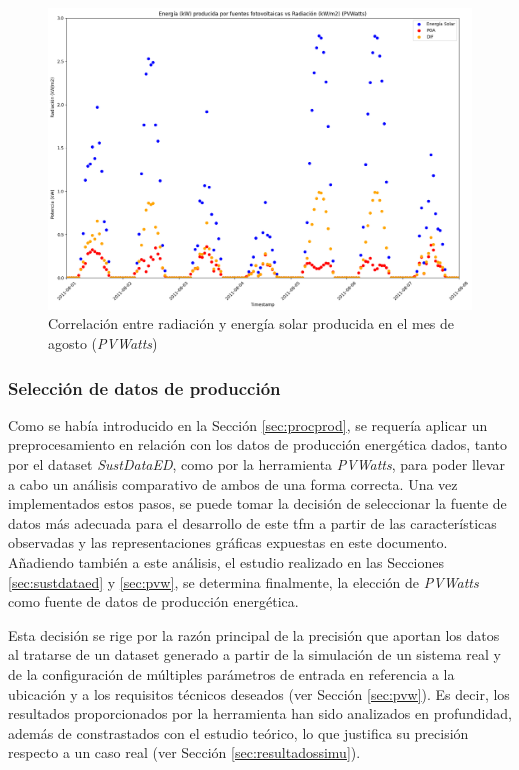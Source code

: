 \begin{figure}[H]
  \centering
  \includegraphics[width=1\textwidth]{img/diseno/energiavsrad.png}
  \caption{Correlación entre radiación y energía solar producida en el mes de agosto (\textit{PVWatts})}
  \label{fig:energiavsrad}
\end{figure}

\subsubsection{Selección de datos de producción}
\label{sec:select}

Como se había introducido en la Sección \ref{sec:procprod}, se requería aplicar un preprocesamiento en relación con los datos de producción energética dados, tanto por el dataset \textit{SustDataED}, como por la herramienta \textit{PVWatts}, para poder llevar a cabo un análisis comparativo de ambos de una forma correcta. Una vez implementados estos pasos, se puede tomar la decisión de seleccionar la fuente de datos más adecuada para el desarrollo de este \gls{tfm} a partir de las características observadas y las representaciones gráficas expuestas en este documento. Añadiendo también a este análisis, el estudio realizado en las Secciones \ref{sec:sustdataed} y \ref{sec:pvw}, se determina finalmente, la elección de \textit{PVWatts} como fuente de datos de producción energética. 

\vspace{3mm}

Esta decisión se rige por la razón principal de la precisión que aportan los datos al tratarse de un dataset generado a partir de la simulación de un sistema real y de la configuración de múltiples parámetros de entrada en referencia a la ubicación y a los requisitos técnicos deseados (ver Sección \ref{sec:pvw}). Es decir, los resultados proporcionados por la herramienta han sido analizados en profundidad, además de constrastados con el estudio teórico, lo que justifica su precisión respecto a un caso real (ver Sección \ref{sec:resultadossimu}).  

